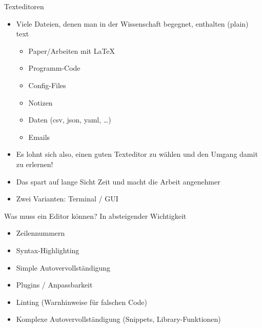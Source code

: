 \begin{frame}{Texteditoren}
  \begin{itemize}
    \item Viele Dateien, denen man in der Wissenschaft begegnet, enthalten (plain) text
      \begin{itemize}
        \item Paper/Arbeiten mit \LaTeX
        \item Programm-Code
        \item Config-Files
        \item Notizen
        \item Daten (csv, json, yaml, …)
        \item Emails
      \end{itemize}
    \item Es lohnt sich also, einen guten Texteditor zu wählen und den Umgang damit zu erlernen!
    \item Das spart auf lange Sicht Zeit und macht die Arbeit angenehmer
    \item Zwei Varianten: Terminal / GUI
  \end{itemize}
\end{frame}

\begin{frame}{Was muss ein Editor können?}
  In absteigender Wichtigkeit

  \begin{itemize}
    \item Zeilennummern
    \item Syntax-Highlighting
    \item Simple Autovervollständigung
    \item Plugins / Anpassbarkeit
    \item Linting (Warnhinweise für falschen Code)
    \item Komplexe Autovervollständigung (Snippets, Library-Funktionen)
  \end{itemize}
\end{frame}

